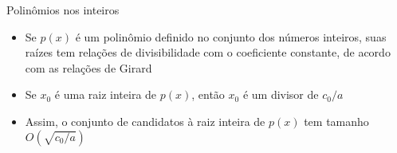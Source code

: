 \begin{frame}[fragile]{Polinômios nos inteiros}

    \begin{itemize}
        \item Se $p(x)$ é um polinômio definido no conjunto dos números inteiros, suas raízes tem relações de divisibilidade com o coeficiente constante, de acordo com as relações de Girard

        \item Se $x_0$ é uma raiz inteira de $p(x)$, então $x_0$ é um divisor de $c_0/a$

        \item Assim, o conjunto de candidatos à raiz inteira de $p(x)$ tem tamanho $O(\sqrt{c_0/a})$
    \end{itemize}

\end{frame}
